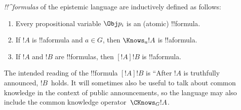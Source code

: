 \documentclass[../../../include/open-logic-section]{subfiles}
\begin{document}
\begin{defn}
\emph{!!^{formula}s} of the epistemic language are inductively
  defined as follows:
\begin{enumerate}


\item Every propositional variable $\Obj p_i$ is an (atomic) !!{formula}.






\item If $!A$ is !!a{formula} and $a \in G$, then $\Knows_a !A$ is
  !!a{formula}.
  
\item If $!A$ and $!B$ are !!{formula}s, then $[!A] !B$ is !!a{formula}.

\end{enumerate}
\end{defn}

The intended reading of the !!{formula} $[!A] !B$ is ``After $!A$ is truthfully announced,
$!B$~holds. It will sometimes also be useful to talk about common knowledge in the context
of public announcements, so the language may also include the common knowledge
operator~$\CKnows_G !A$.
\end{document}
